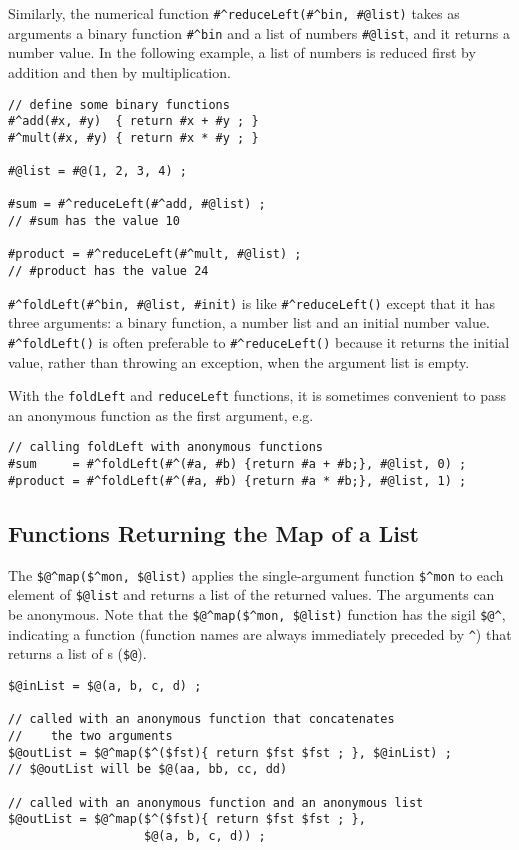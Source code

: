Similarly, the numerical function 
\verb!#^reduceLeft(#^bin, #@list)! 
takes as arguments 
a binary function \verb!#^bin! and
a list of numbers \verb!#@list!,
and it returns a number value.  In
the following example, a list of numbers is reduced first by addition and then by
multiplication.

\begin{Verbatim}
// define some binary functions
#^add(#x, #y)  { return #x + #y ; }
#^mult(#x, #y) { return #x * #y ; }

#@list = #@(1, 2, 3, 4) ;

#sum = #^reduceLeft(#^add, #@list) ;
// #sum has the value 10

#product = #^reduceLeft(#^mult, #@list) ;
// #product has the value 24
\end{Verbatim}

\verb!#^foldLeft(#^bin, #@list, #init)! is like \verb!#^reduceLeft()! except that it
has three arguments: a binary function, a number list and an initial number value.
\verb!#^foldLeft()! is often preferable to \verb!#^reduceLeft()! because
it returns the initial value, rather than throwing an exception, when
the argument list is empty.

With the \texttt{foldLeft} and \texttt{reduceLeft} functions, it is sometimes convenient to pass an
anonymous function as the first argument, e.g.

\begin{Verbatim}
// calling foldLeft with anonymous functions
#sum     = #^foldLeft(#^(#a, #b) {return #a + #b;}, #@list, 0) ;
#product = #^foldLeft(#^(#a, #b) {return #a * #b;}, #@list, 1) ;
\end{Verbatim}


\subsection{Functions Returning the Map of a List}

The \verb!$@^map($^mon, $@list)!
applies the single-argument function \verb!$^mon! to each \fsm{} element of
\verb!$@list! and returns a list of the returned \fsm{} values.  The arguments
can be anonymous.  Note that the \verb!$@^map($^mon, $@list)! function has the sigil
\verb!$@^!, indicating a function (function names are always immediately preceded by \verb!^!) that returns a list of \fsm{}s (\verb!$@!).

\begin{Verbatim}
$@inList = $@(a, b, c, d) ;

// called with an anonymous function that concatenates
//    the two arguments
$@outList = $@^map($^($fst){ return $fst $fst ; }, $@inList) ;
// $@outList will be $@(aa, bb, cc, dd)

// called with an anonymous function and an anonymous list
$@outList = $@^map($^($fst){ return $fst $fst ; }, 
                   $@(a, b, c, d)) ;
\end{Verbatim}

